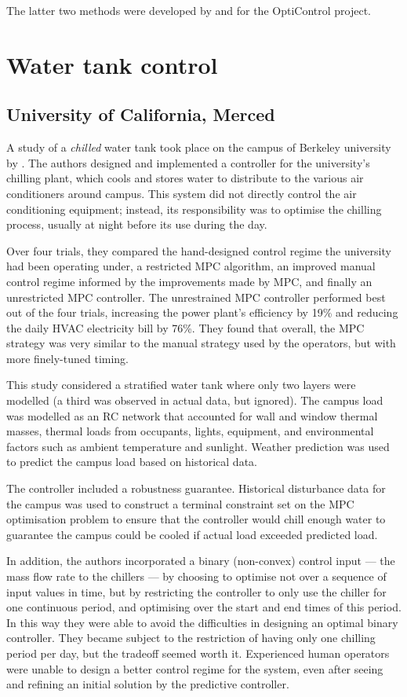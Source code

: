 The latter two methods were developed by and for the OptiControl project.

\section{Water tank control}

\subsection{University of California, Merced}

A study of a \emph{chilled} water tank took place on the campus of Berkeley university by \textcite{Ma12}.
The authors designed and implemented a controller for the university's chilling plant, which cools and stores water to distribute to the various air conditioners around campus.
This system did not directly control the air conditioning equipment; instead, its responsibility was to optimise the chilling process, usually at night before its use during the day.

Over four trials, they compared the hand-designed control regime the university had been operating under, a restricted MPC algorithm, an improved manual control regime informed by the improvements made by MPC, and finally an unrestricted MPC controller.
The unrestrained MPC controller performed best out of the four trials, increasing the power plant's efficiency by 19\% and reducing the daily HVAC electricity bill by 76\%.
They found that overall, the MPC strategy was very similar to the manual strategy used by the operators, but with more finely-tuned timing.

This study considered a stratified water tank where only two layers were modelled (a third was observed in actual data, but ignored).
The campus load was modelled as an RC network that accounted for wall and window thermal masses, thermal loads from occupants, lights, equipment, and environmental factors such as ambient temperature and sunlight.
Weather prediction was used to predict the campus load based on historical data.

The controller included a robustness guarantee.
Historical disturbance data for the campus was used to construct a terminal constraint set on the MPC optimisation problem to ensure that the controller would chill enough water to guarantee the campus could be cooled if actual load exceeded predicted load.

In addition, the authors incorporated a binary (non-convex) control input --- the mass flow rate to the chillers --- by choosing to optimise not over a sequence of input values in time, but by restricting the controller to only use the chiller for one continuous period, and optimising over the start and end times of this period.
In this way they were able to avoid the difficulties in designing an optimal binary controller.
They became subject to the restriction of having only one chilling period per day, but the tradeoff seemed worth it.
Experienced human operators were unable to design a better control regime for the system, even after seeing and refining an initial solution by the predictive controller.

